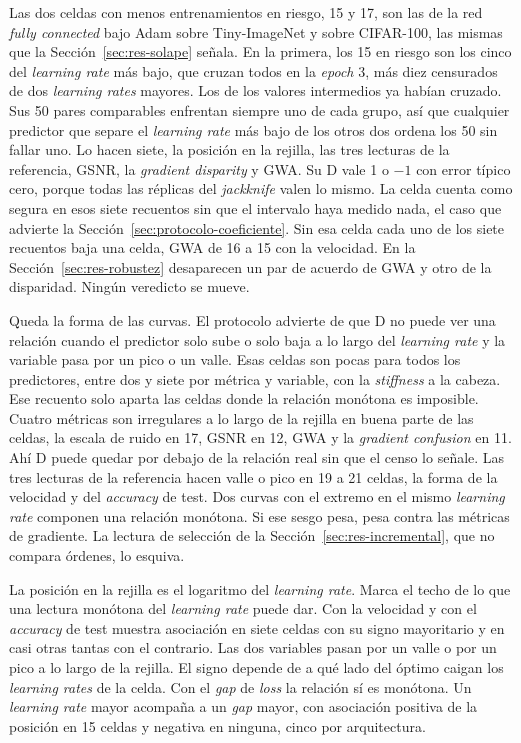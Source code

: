Las dos celdas con menos entrenamientos en riesgo, 15 y 17, son las de la red \emph{fully connected} bajo Adam sobre Tiny-ImageNet y sobre CIFAR-100, las mismas que la Sección~\ref{sec:res-solape} señala. En la primera, los 15 en riesgo son los cinco del \emph{learning rate} más bajo, que cruzan todos en la \emph{epoch} 3, más diez censurados de dos \emph{learning rates} mayores. Los de los valores intermedios ya habían cruzado. Sus 50 pares comparables enfrentan siempre uno de cada grupo, así que cualquier predictor que separe el \emph{learning rate} más bajo de los otros dos ordena los 50 sin fallar uno. Lo hacen siete, la posición en la rejilla, las tres lecturas de la referencia, GSNR, la \emph{gradient disparity} y GWA. Su D vale 1 o $-1$ con error típico cero, porque todas las réplicas del \emph{jackknife} valen lo mismo. La celda cuenta como segura en esos siete recuentos sin que el intervalo haya medido nada, el caso que advierte la Sección~\ref{sec:protocolo-coeficiente}. Sin esa celda cada uno de los siete recuentos baja una celda, GWA de 16 a 15 con la velocidad. En la Sección~\ref{sec:res-robustez} desaparecen un par de acuerdo de GWA y otro de la disparidad. Ningún veredicto se mueve.

Queda la forma de las curvas. El protocolo advierte de que D no puede ver una relación cuando el predictor solo sube o solo baja a lo largo del \emph{learning rate} y la variable pasa por un pico o un valle. Esas celdas son pocas para todos los predictores, entre dos y siete por métrica y variable, con la \emph{stiffness} a la cabeza. Ese recuento solo aparta las celdas donde la relación monótona es imposible. Cuatro métricas son irregulares a lo largo de la rejilla en buena parte de las celdas, la escala de ruido en 17, GSNR en 12, GWA y la \emph{gradient confusion} en 11. Ahí D puede quedar por debajo de la relación real sin que el censo lo señale. Las tres lecturas de la referencia hacen valle o pico en 19 a 21 celdas, la forma de la velocidad y del \emph{accuracy} de test. Dos curvas con el extremo en el mismo \emph{learning rate} componen una relación monótona. Si ese sesgo pesa, pesa contra las métricas de gradiente. La lectura de selección de la Sección~\ref{sec:res-incremental}, que no compara órdenes, lo esquiva.

La posición en la rejilla es el logaritmo del \emph{learning rate}. Marca el techo de lo que una lectura monótona del \emph{learning rate} puede dar. Con la velocidad y con el \emph{accuracy} de test muestra asociación en siete celdas con su signo mayoritario y en casi otras tantas con el contrario. Las dos variables pasan por un valle o por un pico a lo largo de la rejilla. El signo depende de a qué lado del óptimo caigan los \emph{learning rates} de la celda. Con el \emph{gap} de \emph{loss} la relación sí es monótona. Un \emph{learning rate} mayor acompaña a un \emph{gap} mayor, con asociación positiva de la posición en 15 celdas y negativa en ninguna, cinco por arquitectura.

